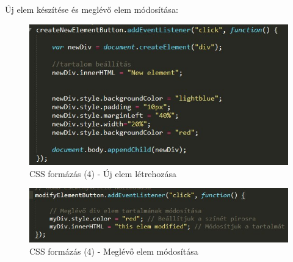 \documentclass[12pt, titlepage]{article}
\begin{document}
\pagebreak

Új elem készítése és meglévő elem módosítása:
\begin{figure}[!h]
	\centering
	\includegraphics[width=\linewidth]{images/javascript/3.jpg}
	\caption{CSS formázás (4) - Új elem létrehozása}
\end{figure}

\begin{figure}[!h]
	\centering
	\includegraphics[width=\linewidth]{images/javascript/4.jpg}
	\caption{CSS formázás (4) - Meglévő elem módosítása}
\end{figure}
\end{document}
